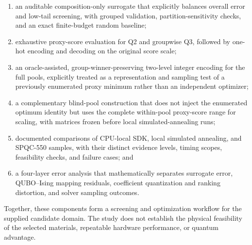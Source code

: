 \begin{enumerate}[leftmargin=2em]
 \item an auditable composition-only surrogate that explicitly balances
       overall error and low-tail screening, with grouped validation,
       partition-sensitivity checks, and an exact finite-budget random baseline;
 \item exhaustive proxy-score evaluation for Q2 and groupwise Q3, followed
       by one-hot encoding and decoding on the original score scale;
 \item an oracle-assisted, group-winner-preserving two-level integer
       encoding for the full pools, explicitly treated as a representation
       and sampling test of a previously enumerated proxy minimum rather
       than an independent optimizer;
 \item a complementary blind-pool construction that does not inject the
       enumerated optimum identity but uses the complete within-pool
       proxy-score range for scaling, with matrices frozen before local
       simulated-annealing runs;
 \item documented comparisons of CPU-local SDK, local simulated annealing,
       and SPQC-550 samples, with their distinct evidence levels, timing
       scopes, feasibility checks, and failure cases; and
 \item a four-layer error analysis that mathematically separates surrogate
       error, QUBO--Ising mapping residuals, coefficient quantization and
       ranking distortion, and solver sampling outcomes.
\end{enumerate}

Together, these components form a screening and optimization workflow
for the supplied candidate domain.  The study does not establish the
physical feasibility of the selected materials, repeatable hardware
performance, or quantum advantage.
